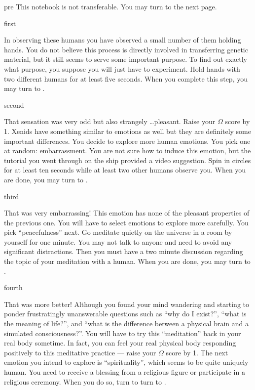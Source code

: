 \documentclass[notebook]{guildcamp1}
\begin{document}
\startnotebook{\nBrainDamage{}}

\begin{page}{pre}
This notebook is not transferable. You may turn to the next page.
\end{page}

\begin{page}{first}

In observing these humans you have observed a small number of them holding hands. You do not believe this process is directly involved in transferring genetic material, but it still seems to serve some important purpose. To find out exactly what purpose, you suppose you will just have to experiment. Hold hands with two different humans for at least five seconds. When you complete this step, you may turn to .

\end{page}

\begin{page}{second}

That sensation was very odd but also strangely \ldots pleasant. Raise your $\Omega$ score by 1. Xenids have something similar to emotions as well but they are definitely some important differences. You decide to explore more human emotions. You pick one at random: embarrassment. You are not sure how to induce this emotion, but the tutorial you went through on the ship provided a video suggestion. Spin in circles for at least ten seconds while at least two other humans observe you. When you are done, you may turn to .

\end{page}

\begin{page}{third}

That was very embarrassing! This emotion has none of the pleasant properties of the previous one. You will have to select emotions to explore more carefully. You pick ``peacefulness'' next. Go meditate quietly on the universe in a room by yourself for one minute. You may not talk to anyone and need to avoid any significant distractions. Then you must have a two minute discussion regarding the topic of your meditation with a human. When you are done, you may turn to .

\end{page}

\begin{page}{fourth}

That was more better! Although you found your mind wandering and starting to ponder frustratingly unanswerable questions such as ``why do I exist?'', ``what is the meaning of life?'', and ``what is the difference between a physical brain and a simulated consciousness?''. You will have to try this ``meditation'' back in your real body sometime. In fact, you can feel your real physical body responding positively to this meditative practice --- raise your $\Omega$ score by 1. The next emotion you intend to explore is ``spirituality'', which seems to be quite uniquely human. You need to receive a blessing from a religious figure or participate in a religious ceremony. When you do so, turn to turn to .

\end{page}
\end{document}
